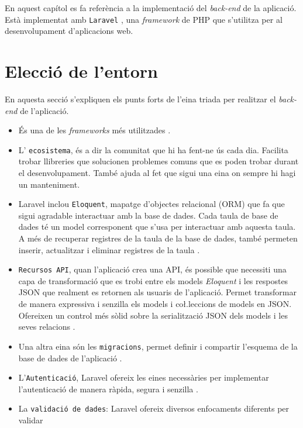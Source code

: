 \label{chap:back-end}

En aquest capítol es fa referència a la implementació del \emph{back-end} de la aplicació.
Està implementat amb \texttt{Laravel} \autocite{laravel}, una \emph{framework} de PHP que
s'utilitza per al desenvolupament d'aplicacions web.

\section{Elecció de l'entorn}
En aquesta secció s'expliquen els punts forts de l'eina triada per realitzar el \emph{back-end} de l'aplicació.

\begin{itemize}
    \item És una de les \emph{frameworks}  més utilitzades \autocite{estadistiques_backend}.
    \item L' \texttt{ecosistema}, és a dir la comunitat que hi ha fent-ne ús cada dia.
    Facilita trobar llibreries que solucionen problemes comuns que es poden trobar durant el desenvolupament.
    També ajuda al fet que sigui una eina on sempre hi hagi un manteniment.
    \item Laravel inclou \texttt{Eloquent}, mapatge d'objectes relacional (ORM) que fa que sigui
    agradable interactuar amb la base de dades. Cada taula de base de dades té un model
    corresponent que s'usa per interactuar amb aquesta taula. A més de recuperar registres
    de la taula de la base de dades, també permeten inserir, actualitzar i eliminar registres
    de la taula \autocite{eloquent_laravel}.
    \item \texttt{Recursos API}, quan l'aplicació crea una API, és possible que necessiti una capa
    de transformació que es trobi entre els models \emph{Eloquent} i les respostes JSON que realment
    es retornen als usuaris de l'aplicació. Permet transformar de manera expressiva i senzilla
    els models i co\l.leccions de models en JSON.
    Ofereixen un control més sòlid sobre la serialització JSON dels models i les seves relacions
    \autocite{resources_laravel}.
    \item Una altra eina són les \texttt{migracions}, permet definir i compartir l'esquema de la
    base de dades de l'aplicació \autocite{migrations_laravel}.
    \item L'\texttt{Autenticació}, Laravel ofereix les eines necessàries per implementar
    l'autenticació de manera ràpida, segura i senzilla \autocite{auth_laravel}.
    \item La \texttt{validació de dades}: Laravel ofereix diversos enfocaments diferents per validar

\end{itemize}
